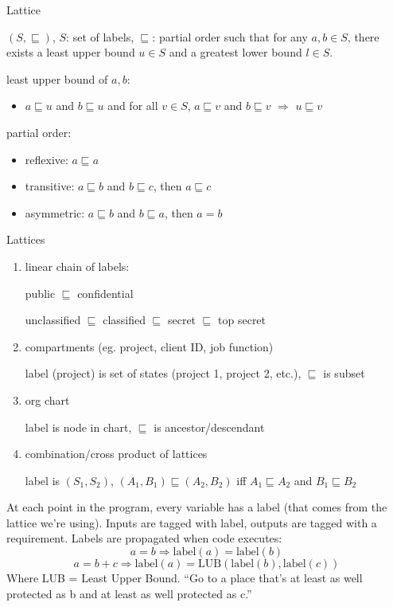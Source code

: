 \begin{definition}{Lattice} %

    $(S, \sqsubseteq)$, $S$: set of labels, $\sqsubseteq$: partial order such
    that for any $a, b \in S$, there exists a least upper bound $u \in S$ and a
    greatest lower bound $l \in S$.

    least upper bound of $a, b$:
    \begin{itemize}
        \item $a \sqsubseteq u$ and $b \sqsubseteq u$ and for all $v \in S$,
            $a \sqsubseteq v$ and $b \sqsubseteq v$ $\Rightarrow$
            $u \sqsubseteq v$
    \end{itemize}

    partial order:
    \begin{itemize}
        \item reflexive: $a \sqsubseteq a$
        \item transitive: $a \sqsubseteq b$ and $b \sqsubseteq c$, then
            $a \sqsubseteq c$
        \item asymmetric: $a \sqsubseteq b$ and $b \sqsubseteq a$, then $a = b$
    \end{itemize}

\end{definition}
\begin{example}{Lattices}
    \begin{enumerate}
        \item linear chain of labels:

            public $\sqsubseteq$ confidential

            unclassified $\sqsubseteq$ classified $\sqsubseteq$ secret
                $\sqsubseteq$ top secret
        \item compartments (eg. project, client ID, job function)

            label (project) is set of states (project 1, project 2, etc.), $\sqsubseteq$ is subset
        \item org chart

            label is node in chart, $\sqsubseteq$ is ancestor/descendant
        \item combination/cross product of lattices

            label is $(S_1, S_2)$, $(A_1, B_1) \sqsubseteq (A_2, B_2)$ iff
            $A_1 \sqsubseteq A_2$ and $B_1 \sqsubseteq B_2$
    \end{enumerate}
\end{example}
At each point in the program, every variable has a label (that comes from the
lattice we're using). Inputs are tagged with label, outputs are tagged with a requirement. Labels are propagated
when code executes:
$$a = b \Rightarrow \text{label}(a) = \text{label}(b)$$
$$a = b + c \Rightarrow \text{label}(a) = \text{LUB}(\text{label}(b), \text{label}(c))$$
Where LUB = Least Upper Bound. ``Go to a place that's at least as well protected as b and at least as well protected as c.''

